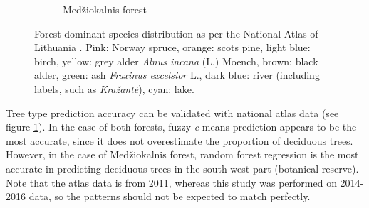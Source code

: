 \documentclass[a4paper,12pt]{scrbook}
\begin{document}
\begin{figure}
\begin{subfigure}[t]{0.45\textwidth}
    \caption{Med\v{z}iokalnis forest}
  \end{subfigure}
  \caption{Forest dominant species distribution as per the National Atlas of Lithuania \citep{treeatlas2011}. Pink: Norway spruce, orange: scots pine, light blue: birch, yellow: grey alder \textit{Alnus incana} (L.) Moench, brown: black alder, green: ash \textit{Fraxinus excelsior} L., dark blue: river (including labels, such as \textit{Kra\v{z}ant\.{e}}), cyan: lake.}
  \label{fig-atlas-forest}
\end{figure}

Tree type prediction accuracy can be validated with national atlas data (see figure \ref{fig-atlas-forest}). In the case of both forests, fuzzy \textit{c}-means prediction appears to be the most accurate, since it does not overestimate the proportion of deciduous trees. However, in the case of Med\v{z}iokalnis forest, random forest regression is the most accurate in predicting deciduous trees in the south-west part (botanical reserve). Note that the atlas data is from 2011, whereas this study was performed on 2014-2016 data, so the patterns should not be expected to match perfectly.
\end{document}
